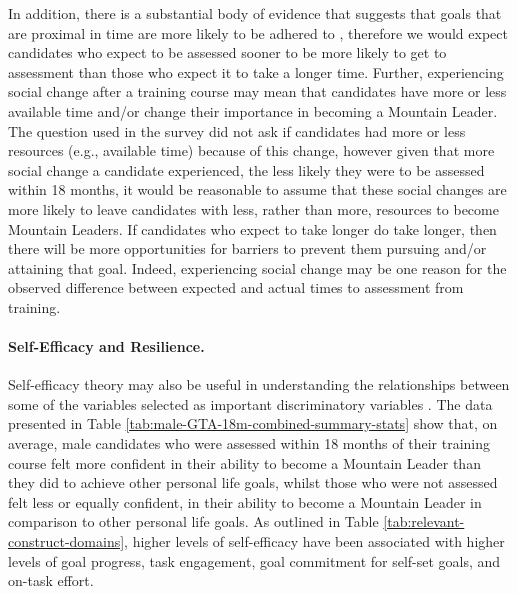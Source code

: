 \documentclass[
  12pt,
  a4paper,
]{book}
\begin{document}
In addition, there is a substantial body of evidence that suggests that goals that are proximal in time are more likely to be adhered to \citep[see][]{Hardy1996, Weinberg2014}, therefore we would expect candidates who expect to be assessed sooner to be more likely to get to assessment than those who expect it to take a longer time. Further, experiencing social change after a training course may mean that candidates have more or less available time and/or change their importance in becoming a Mountain Leader. The question used in the survey did not ask if candidates had more or less resources (e.g., available time) because of this change, however given that more social change a candidate experienced, the less likely they were to be assessed within 18 months, it would be reasonable to assume that these social changes are more likely to leave candidates with less, rather than more, resources to become Mountain Leaders. If candidates who expect to take longer do take longer, then there will be more opportunities for barriers to prevent them pursuing and/or attaining that goal. Indeed, experiencing social change may be one reason for the observed difference between expected and actual times to assessment from training.

\hypertarget{ml-pra-gta-male-self-efficacy-resilience}{%
\paragraph{Self-Efficacy and Resilience.}\label{ml-pra-gta-male-self-efficacy-resilience}}

Self-efficacy theory \citep{Bandura1977, Bandura1982} may also be useful in understanding the relationships between some of the variables selected as important discriminatory variables \citep[n.b.,][ suggested that perceived behavioural control is similar to the construct of self-efficacy]{Ajzen1991}. The data presented in Table \ref{tab:male-GTA-18m-combined-summary-stats} show that, on average, male candidates who were assessed within 18 months of their training course felt more confident in their ability to become a Mountain Leader than they did to achieve other personal life goals, whilst those who were not assessed felt less or equally confident, in their ability to become a Mountain Leader in comparison to other personal life goals. As outlined in Table \ref{tab:relevant-construct-domains}, higher levels of self-efficacy have been associated with higher levels of goal progress, task engagement, goal commitment for self-set goals, and on-task effort.
\end{document}

